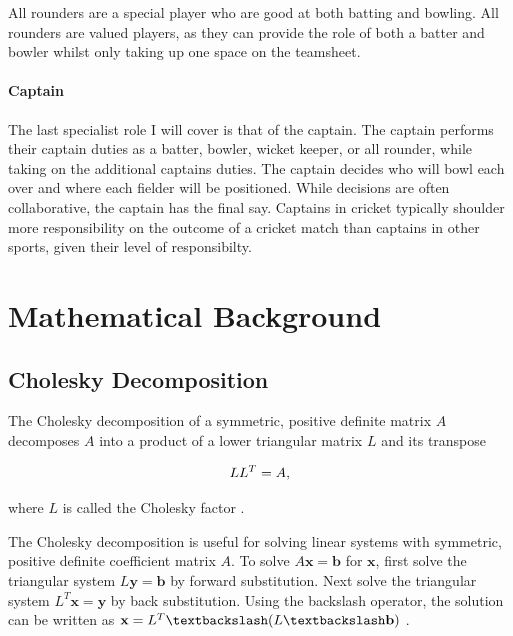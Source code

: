 \documentclass[12pt,a4paper]{report}
\theoremstyle{definition}
\begin{document}
All rounders are a special player who are good at both batting and bowling.
All rounders are valued players, as they can provide the role of both a batter and bowler whilst only taking up one space on the teamsheet.

\subsubsection{Captain}

The last specialist role I will cover is that of the captain. 
The captain performs their captain duties as a batter, bowler, wicket keeper, or all rounder, while taking on the additional captains duties.
The captain decides who will bowl each over and where each fielder will be positioned. 
While decisions are often collaborative, the captain has the final say.
Captains in cricket typically shoulder more responsibility on the outcome of a cricket match than captains in other sports, given their level of responsibilty.

\chapter{Mathematical Background}

\section{Cholesky Decomposition} \label{sec:CholDecomp}

The Cholesky decomposition of a symmetric, positive definite matrix $A$ decomposes $A$ into a product of a lower triangular matrix $L$ and its transpose

\begin{equation}
	\centering
	LL^T = A,
\end{equation}

where $L$ is called the Cholesky factor \citep{RasmussenWilliams2006}. 

The Cholesky decomposition is useful for solving linear systems with symmetric, positive definite coefficient matrix $A$. 
To solve $A\textbf{x} = \textbf{b}$ for $\textbf{x}$, first solve the triangular system $L\textbf{y} = \textbf{b}$ by forward substitution. 
Next solve the triangular system $L^T\textbf{x} = \textbf{y}$ by back substitution.
Using the backslash operator, the solution can be written as $\textbf{x} = L^T \textbackslash (L \textbackslash \textbf{b})$ \citep{RasmussenWilliams2006}.
\end{document}

